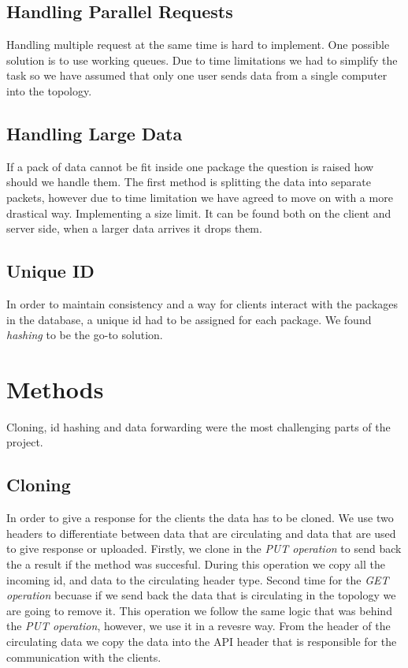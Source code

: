 \documentclass[sigconf,natbib=false]{acmart}
\begin{document}
\subsection{Handling Parallel Requests}
Handling multiple request at the same time is hard to implement. One possible solution is to use working queues. Due to time limitations we had to simplify the task so we have assumed that only one user sends data from a single computer into the topology.
\subsection{Handling Large Data}
If a pack of data cannot be fit inside one package the question is raised how should we handle them. The first method is splitting the data into separate packets, however due to time limitation we have agreed to move on with a more drastical way. Implementing a size limit. It can be found both on the client and server side, when a larger data arrives it drops them.
\subsection{Unique ID}
In order to maintain consistency and a way for clients interact with the packages in the database, a unique id had to be assigned for each package. We found \textit{hashing} to be the go-to solution.
\section{Methods}
Cloning, id hashing and data forwarding were the most challenging parts of the project.
\subsection{Cloning}
In order to give a response for the clients the data has to be cloned. We use two headers to differentiate between data that are circulating and data that are used to give response or uploaded. Firstly, we clone in the \textit{PUT operation} to send back the a result if the method was succesful. During this operation we copy all the incoming id, and data to the circulating header type. Second time for the \textit{GET operation} becuase if we send back the data that is circulating in the topology we are going to remove it. This operation we follow the same logic that was behind the \textit{PUT operation}, however, we use it in a revesre way. From the header of the circulating data we copy the data into the API header that is responsible for the communication with the clients.
\cite{cloning1} \cite{cloning2}
\end{document}
